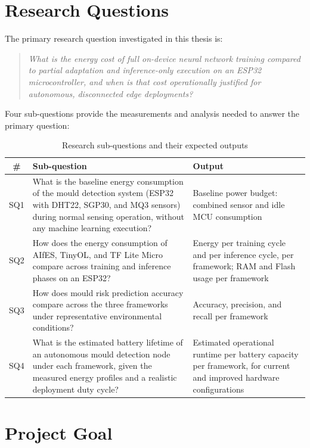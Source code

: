 \section{Research Questions}

The primary research question investigated in this thesis is:

\begin{quote}
\textit{What is the energy cost of full on-device neural network training compared to partial adaptation and inference-only execution on an ESP32 microcontroller, and when is that cost operationally justified for autonomous, disconnected edge deployments?}
\end{quote}

Four sub-questions provide the measurements and analysis needed to answer the primary question:

\begin{table}[H]
\centering
\caption{Research sub-questions and their expected outputs}
\label{tab:subquestions}
\begin{tabulary}{\textwidth}{|c|L|L|}
\hline
\textbf{\#} & \textbf{Sub-question} & \textbf{Output} \\
\hline
SQ1 & What is the baseline energy consumption of the mould detection system (ESP32 with DHT22, SGP30, and MQ3 sensors) during normal sensing operation, without any machine learning execution? & Baseline power budget: combined sensor and idle MCU consumption \\
\hline
SQ2 & How does the energy consumption of AIfES, TinyOL, and TF Lite Micro compare across training and inference phases on an ESP32? & Energy per training cycle and per inference cycle, per framework; RAM and Flash usage per framework \\
\hline
SQ3 & How does mould risk prediction accuracy compare across the three frameworks under representative environmental conditions? & Accuracy, precision, and recall per framework \\
\hline
SQ4 & What is the estimated battery lifetime of an autonomous mould detection node under each framework, given the measured energy profiles and a realistic deployment duty cycle? & Estimated operational runtime per battery capacity per framework, for current and improved hardware configurations \\
\hline
\end{tabulary}
\end{table}

\section{Project Goal}

